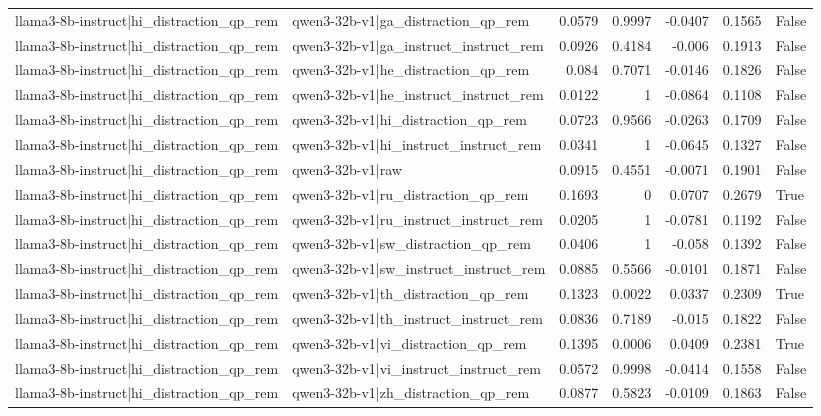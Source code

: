 \begin{table}
\begin{tabular}{l l r r r r l}
llama3-8b-instruct|hi_distraction_qp_rem & qwen3-32b-v1|ga_distraction_qp_rem & 0.0579 & 0.9997 & -0.0407 & 0.1565 & False \\
llama3-8b-instruct|hi_distraction_qp_rem & qwen3-32b-v1|ga_instruct_instruct_rem & 0.0926 & 0.4184 & -0.006 & 0.1913 & False \\
llama3-8b-instruct|hi_distraction_qp_rem & qwen3-32b-v1|he_distraction_qp_rem & 0.084 & 0.7071 & -0.0146 & 0.1826 & False \\
llama3-8b-instruct|hi_distraction_qp_rem & qwen3-32b-v1|he_instruct_instruct_rem & 0.0122 & 1 & -0.0864 & 0.1108 & False \\
llama3-8b-instruct|hi_distraction_qp_rem & qwen3-32b-v1|hi_distraction_qp_rem & 0.0723 & 0.9566 & -0.0263 & 0.1709 & False \\
llama3-8b-instruct|hi_distraction_qp_rem & qwen3-32b-v1|hi_instruct_instruct_rem & 0.0341 & 1 & -0.0645 & 0.1327 & False \\
llama3-8b-instruct|hi_distraction_qp_rem & qwen3-32b-v1|raw & 0.0915 & 0.4551 & -0.0071 & 0.1901 & False \\
llama3-8b-instruct|hi_distraction_qp_rem & qwen3-32b-v1|ru_distraction_qp_rem & 0.1693 & 0 & 0.0707 & 0.2679 & True \\
llama3-8b-instruct|hi_distraction_qp_rem & qwen3-32b-v1|ru_instruct_instruct_rem & 0.0205 & 1 & -0.0781 & 0.1192 & False \\
llama3-8b-instruct|hi_distraction_qp_rem & qwen3-32b-v1|sw_distraction_qp_rem & 0.0406 & 1 & -0.058 & 0.1392 & False \\
llama3-8b-instruct|hi_distraction_qp_rem & qwen3-32b-v1|sw_instruct_instruct_rem & 0.0885 & 0.5566 & -0.0101 & 0.1871 & False \\
llama3-8b-instruct|hi_distraction_qp_rem & qwen3-32b-v1|th_distraction_qp_rem & 0.1323 & 0.0022 & 0.0337 & 0.2309 & True \\
llama3-8b-instruct|hi_distraction_qp_rem & qwen3-32b-v1|th_instruct_instruct_rem & 0.0836 & 0.7189 & -0.015 & 0.1822 & False \\
llama3-8b-instruct|hi_distraction_qp_rem & qwen3-32b-v1|vi_distraction_qp_rem & 0.1395 & 0.0006 & 0.0409 & 0.2381 & True \\
llama3-8b-instruct|hi_distraction_qp_rem & qwen3-32b-v1|vi_instruct_instruct_rem & 0.0572 & 0.9998 & -0.0414 & 0.1558 & False \\
llama3-8b-instruct|hi_distraction_qp_rem & qwen3-32b-v1|zh_distraction_qp_rem & 0.0877 & 0.5823 & -0.0109 & 0.1863 & False \\

\end{tabular}
\end{table}
